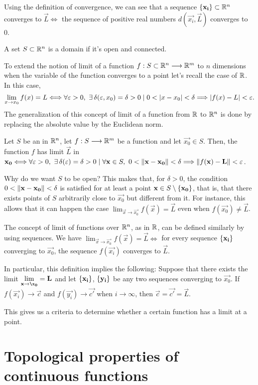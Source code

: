 \begin{remark}
    Using the definition of convergence, we can see that a sequence $\set{\vec{x_i}}\subset\Rtn$ converges to $\vec{L}\iff$
    the sequence of positive real numbers $d(\vec{x_i}, \vec{L})$ converges to 0. \wtf
\end{remark}

\begin{defn}[Domain]\label{def:domain-set}
    A set $S\subset\Rtn$ is a domain if it's open and connected.
\end{defn}

To extend the notion of limit of a function $\appl{f}{S\subset\Rtn}{\R^m}$ to $n$ dimensions when the variable of the 
function converges to a point let's recall the case of $\R$. In this case, 
\begin{equation}
    \lim_{x\to x_0} f(x) = L\iff \forall\epsilon > 0,\ \exists\delta(\epsilon, x_0) = \delta > 0 \st 0 < \abs{x - x_0} < \delta
        \implies\abs{f(x) - L} < \epsilon.
\end{equation}
The generalization of this concept of limit of a function from $\R$ to $\Rtn$ is done by replacing the absolute value
by the Euclidean norm.

\begin{defn}
    Let $S$ be an  in $\Rtn$, let $\appl{f}{S}{\R^m}$ be a function and let $\vec{x_0}\in S$. Then, the
    function $f$ has limit $\vec{L}$ in $\vec{x_0}\iff\forall\epsilon > 0,\ \exists \delta(\epsilon) = \delta > 0 \st
    \forall\vec{x}\in S,\ 0 < \vnorm{\vec{x} - \vec{x_0}} < \delta\implies\vnorm{f(\vec{x}) - \vec{L}} < \epsilon$.
\end{defn}

\begin{note}
    Why do we want $S$ to be open? This makes that, for $\delta > 0$, the condition $0 < \left\Vert \mathbf{x} - \mathbf{x_0} \right\Vert < \delta$
    is satisfied for at least a point $\mathbf{x}\in S\setminus\{ \mathbf{x_0} \}$, that is, that there exists points of $S$
    arbitrarily close to $\vec{x_0}$ but different from it. For instance, this allows that it can happen the case 
    $\lim_{\vec{x}\to\vec{x_0}}f(\vec{x}) = \vec{L}$ even when $f(\vec{x_0})\neq \vec{L}$.
\end{note}

\begin{note}
The concept of limit of functions over $\Rtn$, as in $\R$, can be defined similarly by using sequences. We have 
$\lim_{\vec{x}\to\vec{x_0}} f(\vec{x}) = \vec{L}\iff$ for every sequence $\{ \mathbf{x_i} \}$ converging to $\vec{x_0}$, the
    sequence $f(\vec{x_i})$ converges to $\vec{L}$.

    In particular, this definition implies the following: Suppose that there exists the limit $\lim_{\vec{x}\to\vec{\x_0}}
    = \vec{L}$ and let $\{ \mathbf{x_i} \}$, $\{ \mathbf{y_i} \}$ be any two sequences converging to $\vec{x_0}$. If 
    $f(\vec{x_i})\longrightarrow\vec{c}$ and $f(\vec{y_i})\longrightarrow\vec{c'}$ when $i\longrightarrow\infty$, then
    $\vec{c} = \vec{c'} = \vec{L}$.

    This gives us a criteria to determine whether a certain function has a limit at a point. 
\end{note}

\section{Topological properties of continuous functions}

